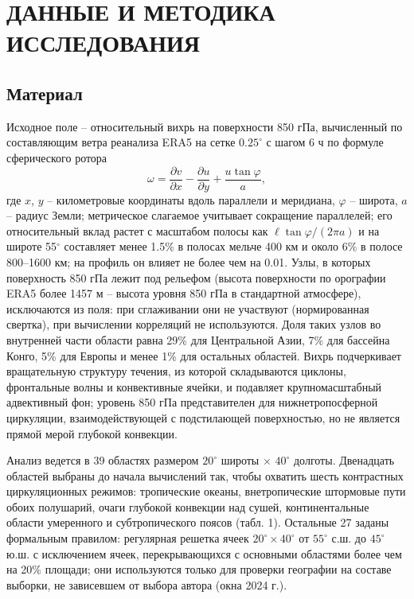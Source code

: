 \documentclass[12pt,a4paper]{article}
\begin{document}
\section{ДАННЫЕ И МЕТОДИКА ИССЛЕДОВАНИЯ}

\subsection{Материал}

Исходное поле -- относительный вихрь на поверхности 850 гПа, вычисленный по составляющим ветра реанализа ERA5 \cite{Hersbach2020,Soci2024} на сетке $0.25^\circ$ с шагом 6 ч по формуле сферического ротора
\begin{equation}
\label{eq:vort}
\omega = \frac{\partial v}{\partial x} - \frac{\partial u}{\partial y} + \frac{u \tan\varphi}{a},
\end{equation}
где $x$, $y$ -- километровые координаты вдоль параллели и меридиана, $\varphi$ -- широта, $a$ -- радиус Земли; метрическое слагаемое учитывает сокращение параллелей; его относительный вклад растет с масштабом полосы как $\ell\tan\varphi/(2\pi a)$ и на широте 55$^\circ$ составляет менее 1.5\% в полосах мельче 400 км и около 6\% в полосе 800--1600 км; на профиль он влияет не более чем на 0.01. Узлы, в которых поверхность 850 гПа лежит под рельефом (высота поверхности по орографии ERA5 более 1457 м -- высота уровня 850 гПа в стандартной атмосфере), исключаются из поля: при сглаживании они не участвуют (нормированная свертка), при вычислении корреляций не используются. Доля таких узлов во внутренней части области равна 29\% для Центральной Азии, 7\% для бассейна Конго, 5\% для Европы и менее 1\% для остальных областей. Вихрь подчеркивает вращательную структуру течения, из которой складываются циклоны, фронтальные волны и конвективные ячейки, и подавляет крупномасштабный адвективный фон; уровень 850 гПа представителен для нижнетропосферной циркуляции, взаимодействующей с подстилающей поверхностью, но не является прямой мерой глубокой конвекции.

Анализ ведется в 39 областях размером $20^\circ$ широты $\times$ $40^\circ$ долготы. Двенадцать областей выбраны до начала вычислений так, чтобы охватить шесть контрастных циркуляционных режимов: тропические океаны, внетропические штормовые пути обоих полушарий, очаги глубокой конвекции над сушей, континентальные области умеренного и субтропического поясов (табл. 1). Остальные 27 заданы формальным правилом: регулярная решетка ячеек $20^\circ \times 40^\circ$ от $55^\circ$ с.ш. до $45^\circ$ ю.ш. с исключением ячеек, перекрывающихся с основными областями более чем на 20\% площади; они используются только для проверки географии на составе выборки, не зависевшем от выбора автора (окна 2024 г.).
\end{document}
